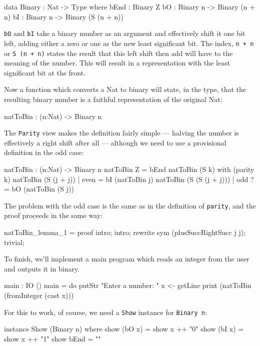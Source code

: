 \begin{code}
data Binary : Nat -> Type where
   bEnd : Binary Z
   bO : Binary n -> Binary (n + n)
   bI : Binary n -> Binary (S (n + n))
\end{code}

\noindent
\texttt{bO} and \texttt{bI} take a binary number as an argument and effectively shift it one bit left, adding either a zero or one as the new least significant bit.
The index, \texttt{n + n} or \texttt{S (n + n)} states the result that this left shift then add will have to the meaning of the number.
This will result in a representation with the least significant bit at the front.

Now a function which converts a Nat to binary will state, in the type, that the resulting binary number is a faithful representation of the original Nat:

\begin{code}
natToBin : (n:Nat) -> Binary n
\end{code}

\noindent
The \texttt{Parity} view makes the definition fairly simple --- halving the number is effectively a right shift after all --- although we need to use a provisional definition in the odd case:

\begin{code}
natToBin : (n:Nat) -> Binary n
natToBin Z = bEnd
natToBin (S k) with (parity k)
   natToBin (S (j + j))     | even  = bI (natToBin j)
   natToBin (S (S (j + j))) | odd  ?= bO (natToBin (S j))
\end{code}

\noindent
The problem with the odd case is the same as in the definition of \texttt{parity}, and the proof proceeds in the same way:

\begin{code}
natToBin_lemma_1 = proof {
    intro;
    intro;
    rewrite sym (plusSuccRightSucc j j);
    trivial;
}
\end{code}

\noindent
To finish, we'll implement a main program which reads an integer from the user and outputs it in binary. 

\begin{code}
main : IO ()
main = do putStr "Enter a number: "
          x <- getLine
          print (natToBin (fromInteger (cast x)))
\end{code}

\noindent
For this to work, of course, we need a \texttt{Show} instance for \texttt{Binary n}:

\begin{code}
instance Show (Binary n) where
    show (bO x) = show x ++ "0"
    show (bI x) = show x ++ "1"
    show bEnd = ""
\end{code}

